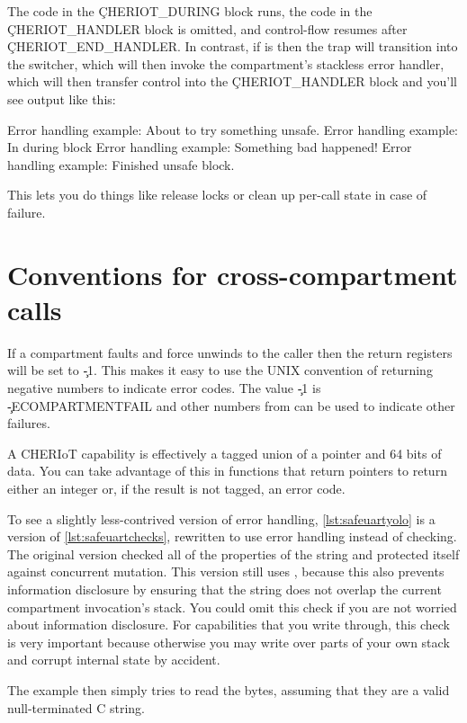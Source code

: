 The code in the \c{CHERIOT_DURING} block runs, the code in the \c{CHERIOT_HANDLER} block is omitted, and control-flow resumes after \c{CHERIOT_END_HANDLER}.
In contrast, if  is  then the trap will transition into the switcher, which will then invoke the compartment's stackless error handler, which will then transfer control into the \c{CHERIOT_HANDLER} block and you'll see output like this:

\begin{console}
Error handling example: About to try something unsafe.
Error handling example: In during block
Error handling example: Something bad happened!
Error handling example: Finished unsafe block.
\end{console}

This lets you do things like release locks or clean up per-call state in case of failure.

\section{Conventions for cross-compartment calls}

If a compartment faults and force unwinds to the caller then the return registers will be set to \c{-1}.
This makes it easy to use the UNIX convention of returning negative numbers to indicate error codes.
The value \c{-1} is \c{-ECOMPARTMENTFAIL} and other numbers from  can be used to indicate other failures.

A CHERIoT capability is effectively a tagged union of a pointer and 64 bits of data.
You can take advantage of this in functions that return pointers to return either an integer or, if the result is not tagged, an error code.

To see a slightly less-contrived version of error handling, \ref{lst:safeuartyolo} is a version of \ref{lst:safeuartchecks}, rewritten to use error handling instead of checking.
The original version checked all of the properties of the string and protected itself against concurrent mutation.
This version still uses , because this also prevents information disclosure by ensuring that the string does not overlap the current compartment invocation's stack.
You could omit this check if you are not worried about information disclosure.
For capabilities that you write through, this check is very important because otherwise you may write over parts of your own stack and corrupt internal state by accident.

The example then simply tries to read the bytes, assuming that they are a valid null-terminated C string.

